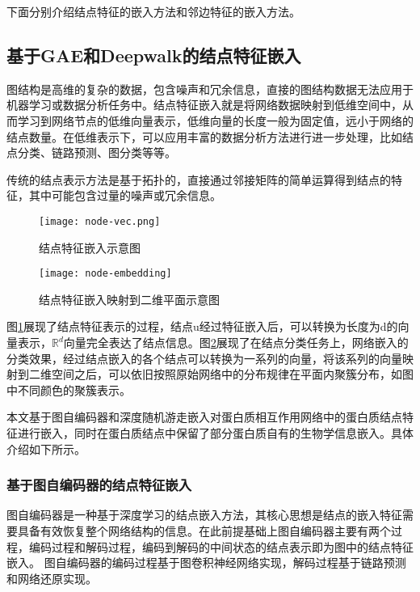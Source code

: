 下面分别介绍结点特征的嵌入方法和邻边特征的嵌入方法。

\subsection{基于GAE和Deepwalk的结点特征嵌入}
\label{subsection:featPPINetwork:nodeFeatConstruct}

图结构是高维的复杂的数据，包含噪声和冗余信息，直接的图结构数据无法应用于机器学习或数据分析任务中。结点特征嵌入就是将网络数据映射到低维空间中，从而学习到网络节点的低维向量表示，低维向量的长度一般为固定值，远小于网络的结点数量。在低维表示下，可以应用丰富的数据分析方法进行进一步处理，比如结点分类、链路预测、图分类等等。

传统的结点表示方法是基于拓扑的，直接通过邻接矩阵的简单运算得到结点的特征，其中可能包含过量的噪声或冗余信息。

\begin{figure}[htbp]
    \centering
    \texttt{[image: node-vec.png]}
    \caption{结点特征嵌入示意图}
    \label{fig:node-vec}
\end{figure}

\begin{figure}[htbp]
    \centering
    \texttt{[image: node-embedding]}
    \caption{结点特征嵌入映射到二维平面示意图}
    \label{fig:node-embedding}
\end{figure}

图\ref{fig:node-vec}展现了结点特征表示的过程，结点u经过特征嵌入后，可以转换为长度为d的向量表示，$\mathbb{R} ^d$向量完全表达了结点信息。图\ref{fig:node-embedding}展现了在结点分类任务上，网络嵌入的分类效果，经过结点嵌入的各个结点可以转换为一系列的向量，将该系列的向量映射到二维空间之后，可以依旧按照原始网络中的分布规律在平面内聚簇分布，如图中不同颜色的聚簇表示。

本文基于图自编码器和深度随机游走嵌入对蛋白质相互作用网络中的蛋白质结点特征进行嵌入，同时在蛋白质结点中保留了部分蛋白质自有的生物学信息嵌入。具体介绍如下所示。

\subsubsection{基于图自编码器的结点特征嵌入}

图自编码器是一种基于深度学习的结点嵌入方法，其核心思想是结点的嵌入特征需要具备有效恢复整个网络结构的信息。在此前提基础上图自编码器主要有两个过程，编码过程和解码过程，编码到解码的中间状态的结点表示即为图中的结点特征嵌入。
图自编码器的编码过程基于图卷积神经网络实现，解码过程基于链路预测和网络还原实现。

